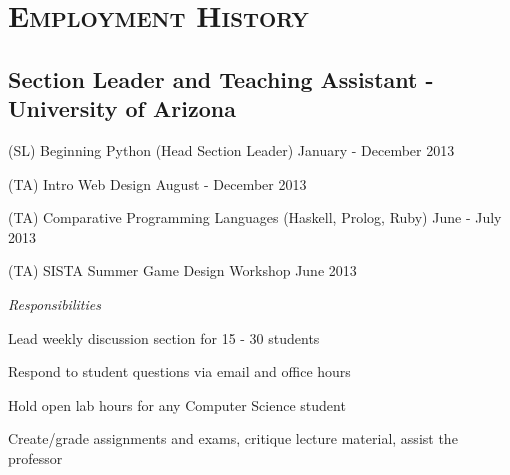 \documentclass[11pt,letterpaper]{article}
\begin{document}
\begin{minipage}{\textwidth}
\section{\scshape Employment History}

\subsection{Section Leader and Teaching Assistant - {\small University of Arizona}}
\begin{adjustwidth}{2em}{0pt}

(SL) Beginning Python {\small (Head Section Leader)} \hfill January - December 2013

(TA) Intro Web Design \hfill August - December 2013

(TA) Comparative Programming Languages {\small (Haskell, Prolog, Ruby)} \hfill June - July 2013

(TA) SISTA Summer Game Design Workshop \hfill June 2013

\vspace{3mm}
{\large \emph {Responsibilities}}

\hspace{2em}Lead weekly discussion section for 15 - 30 students

\hspace{2em}Respond to student questions via email and office hours

\hspace{2em}Hold open lab hours for any Computer Science student

\hspace{2em}Create/grade assignments and exams, critique lecture material, assist the professor
\end{adjustwidth}

\end{minipage}
\end{document}
